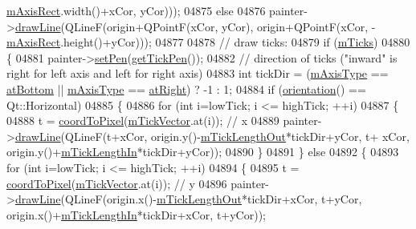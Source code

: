 \begin{DoxyCode}
      \hyperlink{a00025_ad63d51f30f835f3a568b6231362ed4a0}{mAxisRect}.width()+xCor, yCor)));
04875   \textcolor{keywordflow}{else}
04876     painter->\hyperlink{a00047_a0b4b1b9bd495e182c731774dc800e6e0}{drawLine}(QLineF(origin+QPointF(xCor, yCor), origin+QPointF(xCor, -
      \hyperlink{a00025_ad63d51f30f835f3a568b6231362ed4a0}{mAxisRect}.height()+yCor)));
04877   
04878   \textcolor{comment}{// draw ticks:}
04879   \textcolor{keywordflow}{if} (\hyperlink{a00025_ab111e74bba22e06848897c932fc549fe}{mTicks})
04880   \{
04881     painter->\hyperlink{a00047_af9c7a4cd1791403901f8c5b82a150195}{setPen}(\hyperlink{a00025_a7f503910be40fb1717e1635be3ef17e1}{getTickPen}());
04882     \textcolor{comment}{// direction of ticks ("inward" is right for left axis and left for right axis)}
04883     \textcolor{keywordtype}{int} tickDir = (\hyperlink{a00025_ae704bf9f2c2b026f08dd4ccad79c616e}{mAxisType} == \hyperlink{a00025_ae2bcc1728b382f10f064612b368bc18aa220d68888516b6c3b493d144f1ba438f}{atBottom} || \hyperlink{a00025_ae704bf9f2c2b026f08dd4ccad79c616e}{mAxisType} == 
      \hyperlink{a00025_ae2bcc1728b382f10f064612b368bc18aadf5509f7d29199ef2f263b1dd224b345}{atRight}) ? -1 : 1;
04884     \textcolor{keywordflow}{if} (\hyperlink{a00025_a57483f2f60145ddc9e63f3af53959265}{orientation}() == Qt::Horizontal)
04885     \{
04886       \textcolor{keywordflow}{for} (\textcolor{keywordtype}{int} i=lowTick; i <= highTick; ++i)
04887       \{
04888         t = \hyperlink{a00025_a985ae693b842fb0422b4390fe36d299a}{coordToPixel}(\hyperlink{a00025_aae0f9b9973b85be601200f00f5825087}{mTickVector}.at(i)); \textcolor{comment}{// x}
04889         painter->\hyperlink{a00047_a0b4b1b9bd495e182c731774dc800e6e0}{drawLine}(QLineF(t+xCor, origin.y()-\hyperlink{a00025_a2951f26d8a504d330157e05063513809}{mTickLengthOut}*tickDir+yCor, t+
      xCor, origin.y()+\hyperlink{a00025_aea36f29c70d611b4486ebb3a8897c7cd}{mTickLengthIn}*tickDir+yCor));
04890       \}
04891     \} \textcolor{keywordflow}{else}
04892     \{
04893       \textcolor{keywordflow}{for} (\textcolor{keywordtype}{int} i=lowTick; i <= highTick; ++i)
04894       \{
04895         t = \hyperlink{a00025_a985ae693b842fb0422b4390fe36d299a}{coordToPixel}(\hyperlink{a00025_aae0f9b9973b85be601200f00f5825087}{mTickVector}.at(i)); \textcolor{comment}{// y}
04896         painter->\hyperlink{a00047_a0b4b1b9bd495e182c731774dc800e6e0}{drawLine}(QLineF(origin.x()-\hyperlink{a00025_a2951f26d8a504d330157e05063513809}{mTickLengthOut}*tickDir+xCor, t+yCor, 
      origin.x()+\hyperlink{a00025_aea36f29c70d611b4486ebb3a8897c7cd}{mTickLengthIn}*tickDir+xCor, t+yCor));

\end{DoxyCode}

